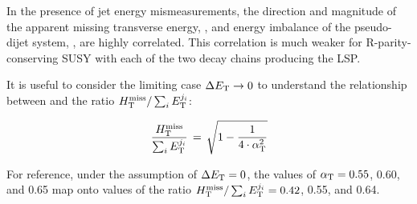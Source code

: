 In the presence of jet energy mismeasurements, the direction and
magnitude of the apparent missing transverse energy, \mht, and energy
imbalance of the pseudo-dijet system, \dEt, are highly correlated.
This correlation is much weaker for R-parity-conserving SUSY with each
of the two decay chains producing the LSP.

It is useful to consider the limiting case $\Delta{E_{\text T}} \rightarrow 0$ to
understand the relationship between \alphat and the ratio
$\mbox{$H_{\rm T}^{\rm miss}$}/\sum_{i} E_\textrm{T}^{j_i}$:

\begin{equation}
  \label{eq:alphat3}
  \frac{\mbox{$H_{\rm T}^{\rm miss}$}}{\sum_{i} E_\textrm{T}^{j_i}} \, = \, \sqrt{ 1 - \frac{1}{4 \cdot \alpha_{\text{T}}^2} }
\end{equation}

For reference, under the assumption of $\Delta{E_{\text T}} = 0$, the values of
$\alpha_{\text{T}} = 0.55$, 0.60, and 0.65 map onto values of the ratio
$\mbox{$H_{\rm T}^{\rm miss}$}/\sum_{i} E_\textrm{T}^{j_i} = 0.42$, 0.55, and 0.64.


